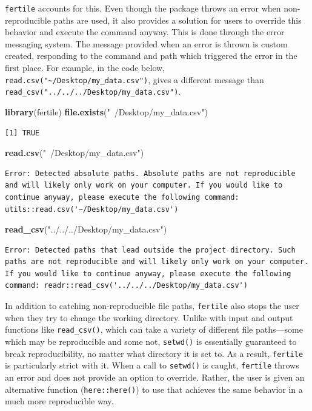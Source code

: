 \documentclass[12pt,twoside]{reedthesis}
\newenvironment{Shaded}{\begin{snugshade}}{\end{snugshade}}
\newcommand{\KeywordTok}[1]{\textcolor[rgb]{0.13,0.29,0.53}{\textbf{#1}}}
\newcommand{\NormalTok}[1]{#1}
\newcommand{\StringTok}[1]{\textcolor[rgb]{0.31,0.60,0.02}{#1}}
\begin{document}
\texttt{fertile} accounts for this. Even though the package throws an error when non-reproducible paths are used, it also provides a solution for users to override this behavior and execute the command anyway. This is done through the error messaging system. The message provided when an error is thrown is custom created, responding to the command and path which triggered the error in the first place. For example, in the code below, \texttt{read.csv("\textasciitilde{}/Desktop/my\_data.csv")}, gives a different message than \texttt{read\_csv("../../../Desktop/my\_data.csv")}.
\begin{Shaded}
\begin{Highlighting}[]
\KeywordTok{library}\NormalTok{(fertile)}
\KeywordTok{file.exists}\NormalTok{(}\StringTok{"~/Desktop/my_data.csv"}\NormalTok{)}
\end{Highlighting}
\end{Shaded}
\begin{verbatim}
[1] TRUE
\end{verbatim}
\begin{Shaded}
\begin{Highlighting}[]
\KeywordTok{read.csv}\NormalTok{(}\StringTok{"~/Desktop/my_data.csv"}\NormalTok{)}
\end{Highlighting}
\end{Shaded}
\begin{verbatim}
Error: Detected absolute paths. Absolute paths are not reproducible and will likely only work on your computer. If you would like to continue anyway, please execute the following command: utils::read.csv('~/Desktop/my_data.csv')
\end{verbatim}
\begin{Shaded}
\begin{Highlighting}[]
\KeywordTok{read_csv}\NormalTok{(}\StringTok{"../../../Desktop/my_data.csv"}\NormalTok{)}
\end{Highlighting}
\end{Shaded}
\begin{verbatim}
Error: Detected paths that lead outside the project directory. Such paths are not reproducible and will likely only work on your computer. If you would like to continue anyway, please execute the following command: readr::read_csv('../../../Desktop/my_data.csv')
\end{verbatim}
In addition to catching non-reproducible file paths, \texttt{fertile} also stops the user when they try to change the working directory. Unlike with input and output functions like \texttt{read\_csv()}, which can take a variety of different file paths---some which may be reproducible and some not, \texttt{setwd()} is essentially guaranteed to break reproducibility, no matter what directory it is set to. As a result, \texttt{fertile} is particularly strict with it. When a call to \texttt{setwd()} is caught, \texttt{fertile} throws an error and does not provide an option to override. Rather, the user is given an alternative function (\texttt{here::here()}) to use that achieves the same behavior in a much more reproducible way.
\end{document}
